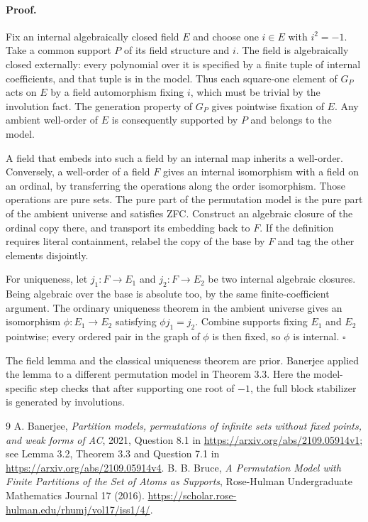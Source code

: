 \documentclass[11pt]{article}
\begin{document}
\paragraph{Proof.} Fix an internal algebraically closed field $E$ and choose one $i\in E$ with $i^2=-1$. Take a common support $P$ of its field structure and $i$. The field is algebraically closed externally: every polynomial over it is specified by a finite tuple of internal coefficients, and that tuple is in the model. Thus each square-one element of $G_P$ acts on $E$ by a field automorphism fixing $i$, which must be trivial by the involution fact. The generation property of $G_P$ gives pointwise fixation of $E$. Any ambient well-order of $E$ is consequently supported by $P$ and belongs to the model.

A field that embeds into such a field by an internal map inherits a well-order. Conversely, a well-order of a field $F$ gives an internal isomorphism with a field on an ordinal, by transferring the operations along the order isomorphism. Those operations are pure sets. The pure part of the permutation model is the pure part of the ambient universe and satisfies ZFC. Construct an algebraic closure of the ordinal copy there, and transport its embedding back to $F$. If the definition requires literal containment, relabel the copy of the base by $F$ and tag the other elements disjointly.

For uniqueness, let $j_1:F\to E_1$ and $j_2:F\to E_2$ be two internal algebraic closures. Being algebraic over the base is absolute too, by the same finite-coefficient argument. The ordinary uniqueness theorem in the ambient universe gives an isomorphism $\phi:E_1\to E_2$ satisfying $\phi j_1=j_2$. Combine supports fixing $E_1$ and $E_2$ pointwise; every ordered pair in the graph of $\phi$ is then fixed, so $\phi$ is internal. \hfill$\square$

The field lemma and the classical uniqueness theorem are prior. Banerjee applied the lemma to a different permutation model in Theorem 3.3. Here the model-specific step checks that after supporting one root of $-1$, the full block stabilizer is generated by involutions.
\begin{thebibliography}{9}
 A. Banerjee, \emph{Partition models, permutations of infinite sets without fixed points, and weak forms of AC}, 2021, Question 8.1 in \url{https://arxiv.org/abs/2109.05914v1}; see Lemma 3.2, Theorem 3.3 and Question 7.1 in \url{https://arxiv.org/abs/2109.05914v4}.
 B. B. Bruce, \emph{A Permutation Model with Finite Partitions of the Set of Atoms as Supports}, Rose-Hulman Undergraduate Mathematics Journal 17 (2016). \url{https://scholar.rose-hulman.edu/rhumj/vol17/iss1/4/}.
\end{thebibliography}
\end{document}
